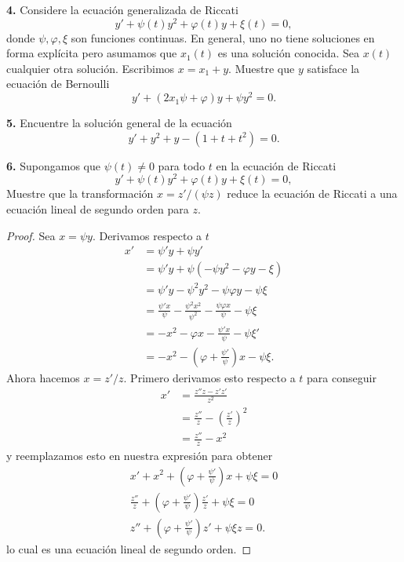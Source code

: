 \documentclass{article}
\newenvironment{statement}[1]{\smallskip\noindent\color[rgb]{1.00,0.00,0.50} {\bf #1.}}{}
\theoremstyle{definition}
\theoremstyle{remark}
\begin{document}
\begin{statement}{4}
  Considere la ecuaci\'on generalizada de Riccati
  \[
    y' + \psi(t) y^2 + \varphi(t) y + \xi(t) = 0,
  \]
  donde $\psi, \varphi, \xi$ son funciones continuas.
  En general, uno no tiene soluciones en forma expl\'icita pero asumamos que
  $x_1(t)$ es una soluci\'on conocida. Sea $x(t)$ cualquier otra soluci\'on.
  Escribimos $x = x_1 + y$. Muestre que $y$ satisface la ecuaci\'on de Bernoulli
  \[
    y' + (2 x_1 \psi + \varphi) y + \psi y^2 = 0.  
  \]
\end{statement}

\begin{statement}{5}
  Encuentre la soluci\'on general de la ecuaci\'on
  \[
    y' + y^2 + y - (1 + t + t^2) = 0.  
  \]
\end{statement}

\begin{statement}{6}
  Supongamos que $\psi(t) \neq 0$ para todo $t$ en la ecuaci\'on de Riccati
  \[
    y' + \psi(t) y^2 + \varphi(t) y + \xi(t) = 0,
  \]
  Muestre que la transformaci\'on $x = z' / (\psi z)$ reduce la ecuaci\'on
  de Riccati a una ecuaci\'on lineal de segundo orden para $z$.
\end{statement}

\begin{proof}
  Sea $x = \psi y$. Derivamos respecto a $t$
  \begin{align*}
    x' &= \psi' y + \psi y'\\
    &= \psi' y + \psi(-\psi y^2 - \varphi y - \xi)\\
    &= \psi' y - \psi^2 y^2 - \psi \varphi y - \psi \xi\\
    &= \frac{\psi' x}{\psi} - \frac{\psi^2 x^2}{\psi^2} - \frac{\psi \varphi x}{\psi} - \psi \xi\\
    &= -x^2 - \varphi x - \frac{\psi' x}{\psi} - \psi \xi'\\
    &= -x^2 - \left(\varphi + \frac{\psi'}{\psi}\right) x - \psi \xi.
  \end{align*}
  Ahora hacemos $x = z' / z$. Primero derivamos esto respecto a $t$ para conseguir
  \begin{align*}
    x' &= \frac{z'' z - z' z'}{z^2}\\
    &= \frac{z''}{z} - \left(\frac{z'}{z}\right)^2\\
    &= \frac{z''}{z} - x^2
  \end{align*}
  y reemplazamos esto en nuestra expresi\'on para obtener
  \begin{align*}
    x' + x^2 + \left(\varphi + \frac{\psi'}{\psi}\right) x + \psi \xi = 0\\
    \frac{z''}{z} + \left(\varphi + \frac{\psi'}{\psi}\right) \frac{z'}{z} + \psi \xi = 0\\
    z'' + \left(\varphi + \frac{\psi'}{\psi}\right) z' + \psi \xi z = 0.
  \end{align*}
  lo cual es una ecuaci\'on lineal de segundo orden.
\end{proof}
\end{document}
